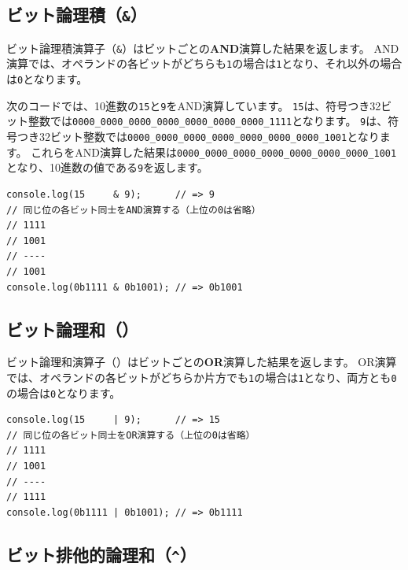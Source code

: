 \hypertarget{bit-and}{%
\subsection{\texorpdfstring{ビット論理積（\texttt{\&}）}{ビット論理積（\&）}}\label{bit-and}}

ビット論理積演算子（\texttt{\&}）はビットごとの\textbf{AND}演算した結果を返します。
AND演算では、オペランドの各ビットがどちらも\texttt{1}の場合は\texttt{1}となり、それ以外の場合は\texttt{0}となります。

次のコードでは、10進数の\texttt{15}と\texttt{9}をAND演算しています。
\texttt{15}は、符号つき32ビット整数では\texttt{0000\_0000\_0000\_0000\_0000\_0000\_0000\_1111}となります。
\texttt{9}は、符号つき32ビット整数では\texttt{0000\_0000\_0000\_0000\_0000\_0000\_0000\_1001}となります。
これらをAND演算した結果は\texttt{0000\_0000\_0000\_0000\_0000\_0000\_0000\_1001}となり、10進数の値である\texttt{9}を返します。

\begin{lstlisting}
console.log(15     & 9);      // => 9
// 同じ位の各ビット同士をAND演算する（上位の0は省略）
// 1111
// 1001
// ----
// 1001
console.log(0b1111 & 0b1001); // => 0b1001
\end{lstlisting}

\hypertarget{bit-or}{%
\subsection{\texorpdfstring{ビット論理和（\texttt{\textbar{}}）}{ビット論理和（\textbar{}）}}\label{bit-or}}

ビット論理和演算子（\texttt{\textbar{}}）はビットごとの\textbf{OR}演算した結果を返します。
OR演算では、オペランドの各ビットがどちらか片方でも\texttt{1}の場合は\texttt{1}となり、両方とも\texttt{0}の場合は\texttt{0}となります。

\begin{lstlisting}
console.log(15     | 9);      // => 15
// 同じ位の各ビット同士をOR演算する（上位の0は省略）
// 1111
// 1001
// ----
// 1111
console.log(0b1111 | 0b1001); // => 0b1111
\end{lstlisting}

\hypertarget{bit-xor}{%
\subsection{\texorpdfstring{ビット排他的論理和（\texttt{\^{}}）}{ビット排他的論理和（\^{}）}}\label{bit-xor}}


